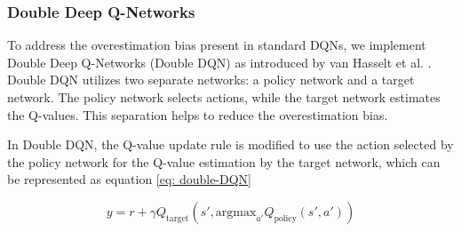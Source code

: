 \begin{comment}
The DQN method demonstrated superior performance to existing RL methods and human experts on several games, indicating its capacity to learn directly from raw inputs without prior knowledge. The advent of DQNs represents a pivotal moment in the integration of deep learning and reinforcement learning. By effectively merging Q-learning with deep convolutional neural networks (CNNs) and experience replay, this approach has set a new standard for reinforcement learning (RL) algorithms, achieving state-of-the-art results on a variety of Atari games. This success serves to illustrate the potential of deep learning techniques in addressing complex RL tasks, thereby paving the way for future advancements in the field. \cite{mnih2013playingatarideepreinforcement}
\end{comment}






\subsubsection{Double Deep Q-Networks}
\label{subsec:double_dqn}
To address the overestimation bias present in standard DQNs, we implement Double Deep Q-Networks (Double DQN) as introduced by van Hasselt et al. \cite{van_Hasselt_Guez_Silver_2016}. Double DQN utilizes two separate networks: a policy network and a target network. The policy network selects actions, while the target network estimates the Q-values. This separation helps to reduce the overestimation bias.

In Double DQN, the Q-value update rule is modified to use the action selected by the policy network for the Q-value estimation by the target network, which can be represented as equation \ref{eq: double-DQN}

\begin{equation} \label{eq: double-DQN}
y = r + \gamma Q_{\text{target}}(s', \text{argmax}_{a'} Q_{\text{policy}}(s', a'))
\end{equation}

